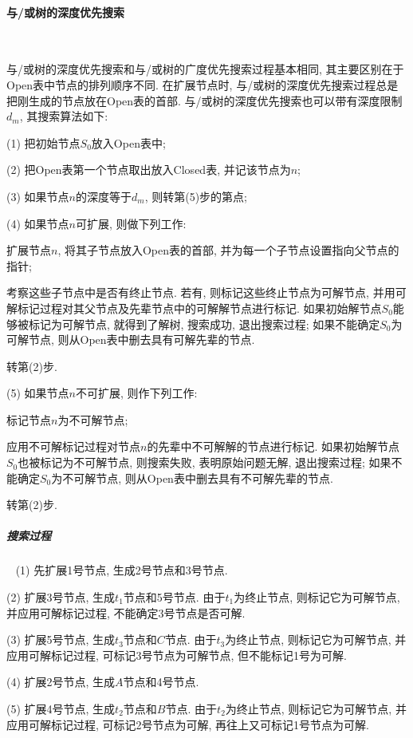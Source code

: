 \paragraph{与/或树的深度优先搜索}~{}

与/或树的深度优先搜索和与/或树的广度优先搜索过程基本相同, 其主要区别在于Open表中节点的排列顺序不同. 在扩展节点时, 与/或树的深度优先搜索过程总是把刚生成的节点放在Open表的首部.
与/或树的深度优先搜索也可以带有深度限制$d_m$, 其搜索算法如下:

(1) 把初始节点$S_0$放入Open表中;

(2) 把Open表第一个节点取出放入Closed表, 并记该节点为$n$;

(3) 如果节点$n$的深度等于$d_m$, 则转第(5)步的第点;

(4) 如果节点$n$可扩展, 则做下列工作:

    扩展节点$n$, 将其子节点放入Open表的首部, 并为每一个子节点设置指向父节点的指针;

     考察这些子节点中是否有终止节点. 若有, 则标记这些终止节点为可解节点, 并用可解标记过程对其父节点及先辈节点中的可解解节点进行标记. 如果初始解节点$S_0$能够被标记为可解节点, 就得到了解树, 搜索成功, 退出搜索过程; 如果不能确定$S_0$为可解节点, 则从Open表中删去具有可解先辈的节点.

    转第(2)步.

(5) 如果节点$n$不可扩展, 则作下列工作:

   \quad{} 标记节点$n$为不可解节点;

   \quad{} 应用不可解标记过程对节点$n$的先辈中不可解解的节点进行标记. 如果初始解节点$S_0$也被标记为不可解节点, 则搜索失败, 表明原始问题无解, 退出搜索过程; 如果不能确定$S_0$为不可解节点, 则从Open表中删去具有不可解先辈的节点.

   \quad{} 转第(2)步.
\subparagraph{搜索过程}~{}
(1) 先扩展1号节点, 生成2号节点和3号节点.

(2) 扩展3号节点, 生成$t_1$节点和5号节点. 由于$t_1$为终止节点, 则标记它为可解节点, 并应用可解标记过程, 不能确定3号节点是否可解.

(3) 扩展5号节点, 生成$t_3$节点和$C$节点. 由于$t_3$为终止节点, 则标记它为可解节点, 并应用可解标记过程, 可标记3号节点为可解节点, 但不能标记1号为可解.

(4) 扩展2号节点, 生成$A$节点和4号节点.

(5) 扩展4号节点, 生成$t_2$节点和$B$节点. 由于$t_2$为终止节点, 则标记它为可解节点, 并应用可解标记过程, 可标记2号节点为可解, 再往上又可标记1号节点为可解.

